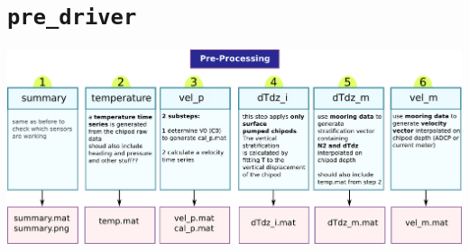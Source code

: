 \chapter{\texttt{pre\_driver}}

\begin{landscape}
\includegraphics[width=1.3\textheight]{figs/pre_processing.pdf}
\end{landscape}
